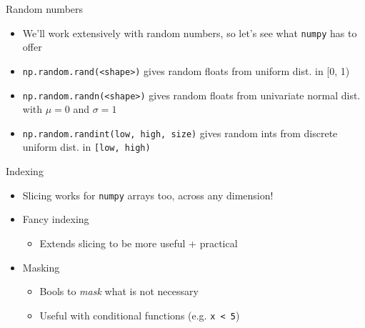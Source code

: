 \documentclass[presentation]{beamer}
\begin{document}
\begin{frame}[label={sec:orga0e0fe7},fragile]{Random numbers}
\begin{itemize}
\item We'll work extensively with random numbers, so let's see what \texttt{numpy} has
to offer
\item \texttt{np.random.rand(<shape>)} gives random floats from uniform dist. in [0, 1)
\item \texttt{np.random.randn(<shape>)} gives random floats from univariate normal
dist. with \(\mu = 0\) and \(\sigma = 1\)
\item \texttt{np.random.randint(low, high, size)} gives random ints from discrete uniform dist.
in \texttt{[low, high)}
\end{itemize}
\end{frame}
\begin{frame}[label={sec:org76c7e1c},fragile]{Indexing}
\begin{itemize}
\item Slicing works for \texttt{numpy} arrays too, across any dimension!
\item Fancy indexing
\begin{itemize}
\item Extends slicing to be more useful + practical
\end{itemize}
\item Masking
\begin{itemize}
\item Bools to \emph{mask} what is not necessary
\item Useful with conditional functions (e.g. \texttt{x < 5})
\end{itemize}
\end{itemize}
\end{frame}
\end{document}

